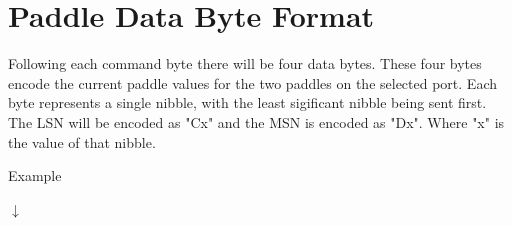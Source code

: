 \documentclass[a4paper,12pt]{article}
\begin{document}
\section*{Paddle Data Byte Format}
Following each command byte there will be four data bytes. These four bytes
encode the current paddle values for the two paddles on the selected port. Each
byte represents a single nibble, with the least sigificant nibble being sent first.
The LSN will be encoded as "Cx" and the MSN is encoded as "Dx".
Where "x" is the value of that nibble.

\medskip

\begin{outerbox}{Example}
    {\centering $\downarrow$ \par}

\end{outerbox}
\end{document}
